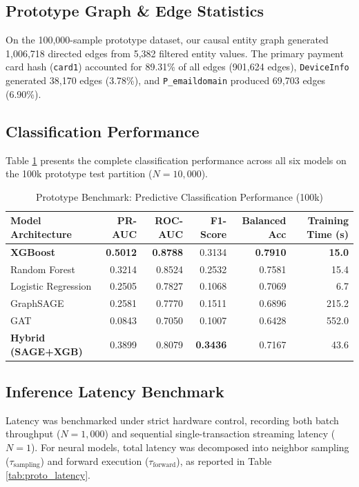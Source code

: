 \documentclass[11pt,a4paper]{report}
\begin{document}
\subsection{Prototype Graph \& Edge Statistics}
On the 100,000-sample prototype dataset, our causal entity graph generated 1,006,718 directed edges from 5,382 filtered entity values. The primary payment card hash (\texttt{card1}) accounted for 89.31\% of all edges (901,624 edges), \texttt{DeviceInfo} generated 38,170 edges (3.78\%), and \texttt{P\_emaildomain} produced 69,703 edges (6.90\%).

\subsection{Classification Performance}
Table \ref{tab:proto_overall_metrics} presents the complete classification performance across all six models on the 100k prototype test partition ($N = 10,000$).

\begin{table}[H]
\centering
\caption{Prototype Benchmark: Predictive Classification Performance (100k)}
\label{tab:proto_overall_metrics}
\begin{tabular}{lrrrrr}
\toprule
\textbf{Model Architecture} & \textbf{PR-AUC} & \textbf{ROC-AUC} & \textbf{F1-Score} & \textbf{Balanced Acc} & \textbf{Training Time (s)} \\
\midrule
\textbf{XGBoost} & \textbf{0.5012} & \textbf{0.8788} & 0.3134 & \textbf{0.7910} & \textbf{15.0} \\
Random Forest & 0.3214 & 0.8524 & 0.2532 & 0.7581 & 15.4 \\
Logistic Regression & 0.2505 & 0.7827 & 0.1068 & 0.7069 & 6.7 \\
GraphSAGE & 0.2581 & 0.7770 & 0.1511 & 0.6896 & 215.2 \\
GAT & 0.0843 & 0.7050 & 0.1007 & 0.6428 & 552.0 \\
\textbf{Hybrid (SAGE+XGB)} & 0.3899 & 0.8079 & \textbf{0.3436} & 0.7167 & 43.6 \\
\bottomrule
\end{tabular}
\end{table}

\subsection{Inference Latency Benchmark}
Latency was benchmarked under strict hardware control, recording both batch throughput ($N=1,000$) and sequential single-transaction streaming latency ($N=1$). For neural models, total latency was decomposed into neighbor sampling ($\tau_{\text{sampling}}$) and forward execution ($\tau_{\text{forward}}$), as reported in Table \ref{tab:proto_latency}.
\end{document}
